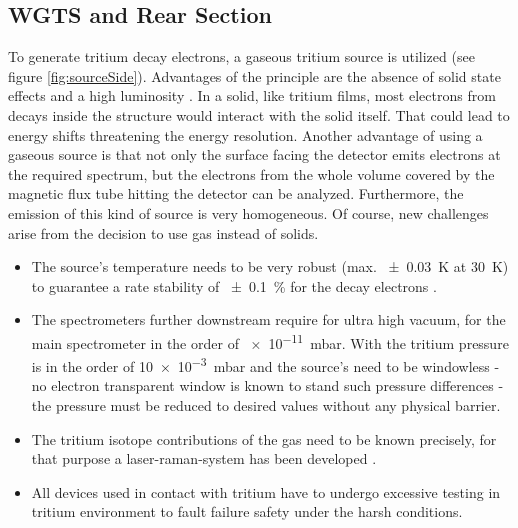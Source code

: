       
      \subsection{WGTS and Rear Section}
      \label{ch:The KATRIN experiment:sec:Experimental setup:subsec:sourceSide}
      To generate tritium decay electrons, a gaseous tritium source is utilized (see figure \ref{fig:sourceSide}). Advantages of the principle are the absence of solid state effects and a high luminosity \cite{letterOfIntent}. In a solid, like tritium films, most electrons from decays inside the structure would interact with the solid itself. That could lead to energy shifts threatening the energy resolution. Another advantage of using a gaseous source is that not only the surface facing the detector emits electrons at the required spectrum, but the electrons from the whole volume covered by the magnetic flux tube hitting the detector can be analyzed. Furthermore, the emission of this kind of source is very homogeneous. Of course, new challenges arise from the decision to use gas instead of solids.
      \begin{itemize}
		\item The source's temperature needs to be very robust (max. \SI{\pm0.03}{\kelvin} at \SI{30}{\kelvin}) to guarantee a rate stability of \SI{\pm0.1}{\percent} for the decay electrons \cite{temperatureWGTS}.
      	\item The spectrometers further downstream require for ultra high vacuum, for the main spectrometer in the order of \SI{e-11}{\milli\bar}. With the tritium pressure is in the order of \SI{10e-3}{\milli\bar} and the source's need to be windowless - no electron transparent window is known to stand such pressure differences - the pressure must be reduced to desired values without any physical barrier.
      	\item The tritium isotope contributions of the gas need to be known precisely, for that purpose a laser-raman-system has been developed \cite{calibrationRaman}.
      	\item All devices used in contact with tritium have to undergo excessive testing in tritium environment to fault failure safety under the harsh conditions.
      \end{itemize}
      
